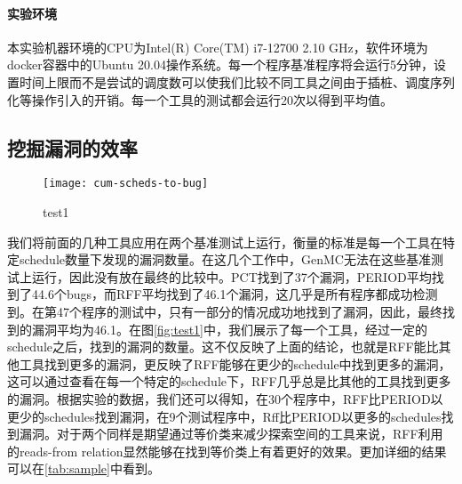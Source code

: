 \paragraph{实验环境}本实验机器环境的CPU为Intel(R) Core(TM) i7-12700 2.10 GHz，软件环境为docker容器中的Ubuntu 20.04操作系统。每一个程序基准程序将会运行5分钟，设置时间上限而不是尝试的调度数可以使我们比较不同工具之间由于插桩、调度序列化等操作引入的开销。每一个工具的测试都会运行20次以得到平均值。

\subsection{挖掘漏洞的效率}

\begin{figure}[ht]
    \centering
    \texttt{[image: cum-scheds-to-bug]}
    \caption{\label{fig:test1}test1}
\end{figure}


我们将前面的几种工具应用在两个基准测试上运行，衡量的标准是每一个工具在特定schedule数量下发现的漏洞数量。在这几个工作中，GenMC无法在这些基准测试上运行，因此没有放在最终的比较中。PCT找到了37个漏洞，PERIOD平均找到了44.6个bugs，而RFF平均找到了46.1个漏洞，这几乎是所有程序都成功检测到。在第47个程序的测试中，只有一部分的情况成功地找到了漏洞，因此，最终找到的漏洞平均为46.1。在图\autoref{fig:test1}中，我们展示了每一个工具，经过一定的schedule之后，找到的漏洞的数量。这不仅反映了上面的结论，也就是RFF能比其他工具找到更多的漏洞，更反映了RFF能够在更少的schedule中找到更多的漏洞，这可以通过查看在每一个特定的schedule下，RFF几乎总是比其他的工具找到更多的漏洞。根据实验的数据，我们还可以得知，在30个程序中，RFF比PERIOD以更少的schedules找到漏洞，在9个测试程序中，Rff比PERIOD以更多的schedules找到漏洞。对于两个同样是期望通过等价类来减少探索空间的工具来说，RFF利用的reads-from relation显然能够在找到等价类上有着更好的效果。更加详细的结果可以在\autoref{tab:sample}中看到。



